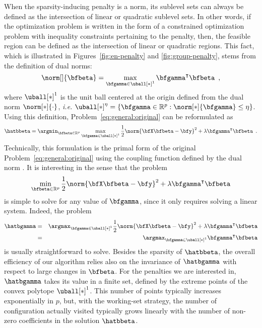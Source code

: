 When the sparsity-inducing penalty is a norm, its sublevel sets can always be
defined as the intersection of linear or quadratic sublevel sets.  In other
words, if the optimization problem is written in the form of a constrained
optimization problem with inequality constraints pertaining to the penalty,
then, the feasible region can be defined as the intersection of linear or
quadratic regions. 
This fact, which is illustrated in Figures~\ref{fig:en-penalty} and
\ref{fig:group-penalty}, stems from the definition of dual norms:
%
\begin{equation*}%
  \norm[]{\bfbeta} = \max_{\bfgamma\in\uball[*]^{1}} \bfgamma^\intercal \bfbeta
  \enspace,
\end{equation*}
where $\uball[*]^{1}$ is the unit ball centered at the origin defined from the dual
norm $\norm[*]{\cdot}$, \textit{i.e.}
$\uball[*]^{\eta}=\left\{\bfgamma\in\mathbb{R}^p:\norm[*]{\bfgamma}\leq \eta\right\}$.
Using this definition, Problem~\eqref{eq:general:original} can be reformulated
as
%
\begin{equation}\label{eq:general:primal}
  \hatbbeta = \argmin_{\bfbeta\in\mathbb{R}^p} 
  \max_{\bfgamma\in\uball[*]^{1}}
    \frac{1}{2} \norm{\bfX \bfbeta - \bfy}^2 + 
    \lambda \bfgamma^\intercal \bfbeta
  \enspace. 
\end{equation}
%
Technically, this formulation is the primal form of the original 
Problem~\eqref{eq:general:original} using the coupling function defined by the 
dual norm \citep[see e.g.][]{Gilbert16, Bonnans06}. 
It is interesting in the sense that the problem
%
\begin{equation*}
  \min_{\bfbeta\in\mathbb{R}^p} 
  \frac{1}{2} \norm{\bfX \bfbeta - \bfy}^2 + 
  \lambda \bfgamma^\intercal \bfbeta
\end{equation*}
%
is simple to solve for any value of $\bfgamma$, since it only requires solving 
a linear system. 
Indeed, the problem
%
\begin{eqnarray}
  \hatbgamma & = & \argmax_{\bfgamma\in\uball[*]^{1}}
    \frac{1}{2} \norm{\bfX \bfbeta - \bfy}^2 + 
    \lambda \bfgamma^\intercal \bfbeta \nonumber \\
     & = & \argmax_{\bfgamma\in\uball[*]^{1}}
    \bfgamma^\intercal \bfbeta \label{eq:optimal_gamma}
\end{eqnarray}
%
is usually straightforward to solve.
Besides the sparsity of $\hatbbeta$, the overall efficiency of our algorithm
relies also on the invariance of $\hatbgamma$ with respect to
large changes in $\bfbeta$. 
For the penalties we are interested in, $\hatbgamma$ takes its value in a
finite set, defined by the extreme points of the convex polytope $\uball[*]^{1}$.
This number of points typically increases exponentially in $p$, but, with the working-set
strategy, the number of configuration actually visited typically grows linearly
with the number of non-zero coefficients in the solution $\hatbbeta$.

